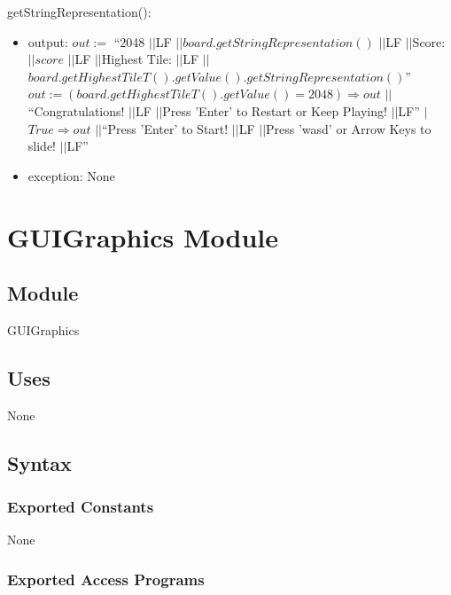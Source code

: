 \documentclass[12pt]{article}
\newcommand{\concat}{$\vert\vert$}
\begin{document}
\noindent getStringRepresentation():
\begin{itemize}
  \item output: $out := $ ``2048 \concat LF \concat $board.getStringRepresentation()$ \concat LF \concat  Score: \concat $score$ \concat LF \concat Highest Tile: \concat LF \concat $board.getHighestTileT().getValue().getStringRepresentation()$''\\

        $out := (board.getHighestTileT().getValue() = 2048) \Rightarrow out$ \concat ``Congratulations! \concat LF \concat Press 'Enter' to Restart or Keep Playing! \concat LF'' $\vert $\\

        $True \Rightarrow out$ \concat ``Press 'Enter' to Start! \concat LF \concat Press 'wasd' or Arrow Keys to slide! \concat LF''
  \item exception: None
\end{itemize}

\newpage

\newpage

\section* {GUIGraphics Module}

\subsection* {Module}

GUIGraphics

\subsection* {Uses}

None

\subsection* {Syntax}

\subsubsection* {Exported Constants}

None

\subsubsection* {Exported Access Programs}
\end{document}
